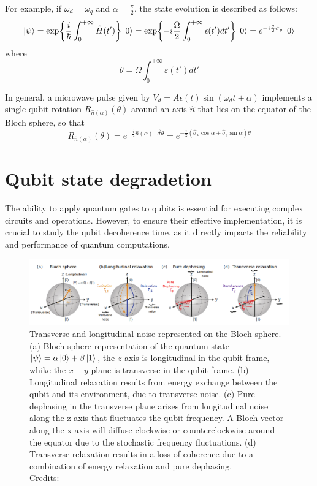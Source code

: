 For example, if $\omega_d = \omega_q$ and $\alpha=\frac{\pi}{2}$, the state evolution is described as follows:
\begin{align}
    \ket{\psi} = \exp{\frac{i}{\hbar}\int_{0}^{+\infty} \hat{H}(t')}\ket{0} = \exp{-i\frac{\Omega}{2}\int_{0}^{+\infty}\epsilon(t')dt'}\ket{0} = e^{-i\frac{\theta}{2}\hat{\sigma}_y}\ket{0}
\end{align}
where
\begin{equation}
    \theta = \Omega\int_{0}^{+\infty}\varepsilon(t')dt'
\end{equation}

In general, a microwave pulse given by $V_d = A\epsilon(t) \sin(\omega_d t + \alpha)$ implements a single-qubit rotation $R_{\hat{n}(\alpha)}(\theta)$ around an axis $\hat{n}$ that lies on the equator of the Bloch sphere, so that
\begin{equation}
    R_{\hat{n}(\alpha)}(\theta) = e^{-\frac{i}{2} \hat{n}(\alpha) \cdot \vec{\sigma} \theta} = e^{-\frac{i}{2} (\hat{\sigma}_x \cos \alpha + \hat{\sigma}_y \sin \alpha) \theta}
\end{equation}

\section{Qubit state degradetion}
The ability to apply quantum gates to qubits is essential for executing complex circuits and operations. 
However, to ensure their effective implementation, it is crucial to study the qubit decoherence time, as it directly impacts the reliability and performance of quantum computations.

\begin{figure}[h!]
    \centering
    \includegraphics[width=\textwidth]{figures/png/noise_model.png}
    \caption{Transverse and longitudinal noise represented on the Bloch sphere. 
    (a) Bloch sphere representation of the quantum state $\ket{\psi}= \alpha\ket{0} + \beta\ket{1}$, the $z$-axis is longitudinal in the qubit frame, whike the $x-y$ plane is transverse in the qubit frame.
    (b) Longitudinal relaxation results from energy exchange between the qubit and its environment, due to transverse noise.
    (c) Pure dephasing in the transverse plane arises from longitudinal noise along the z axis that fluctuates the qubit frequency. A Bloch vector along the x-axis will diffuse clockwise or counterclockwise around the equator due to the stochastic frequency fluctuations.
    (d)  Transverse relaxation results in a loss of coherence due to a combination of energy relaxation and pure dephasing. \\Credits: \cite{krantz_quantum_2019}}
    \label{fig:noise_model}
\end{figure}

